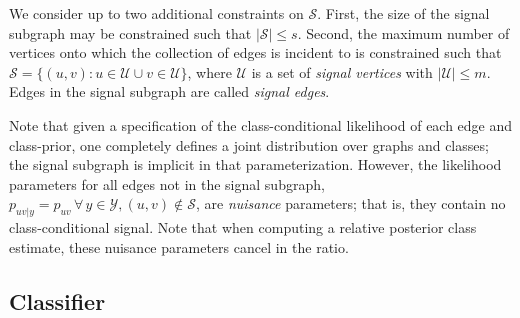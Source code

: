 \documentclass[10pt,journal,cspaper,compsoc]{IEEEtran}
\providecommand{\mc}[1]{\mathcal{#1}}
\begin{document}
We consider up to two additional constraints on $\mc{S}$.  First, the size of the signal subgraph may be constrained such that $|\mc{S}| \leq s$. Second, the maximum number of vertices onto which the collection of edges is incident to is constrained such that $\mc{S}=\{(u,v): u \in \mc{U} \cup v \in \mc{U}\}$, where $\mc{U}$ is a set of \emph{signal vertices} with $|\mc{U}|\leq m$. Edges in the signal subgraph are called \emph{signal edges}. 

Note that given a specification of the class-conditional likelihood of each edge and class-prior, one completely defines a joint distribution over graphs and classes; the signal subgraph is implicit in that parameterization. However, the likelihood parameters for all edges not in the signal subgraph, $p_{uv|y}=p_{uv} \, \forall \, y \in \mc{Y}, (u,v) \notin \mc{S}$,  are \emph{nuisance} parameters; that is, they contain no class-conditional signal.  Note that when computing a relative posterior class estimate, these nuisance parameters cancel in the ratio.




\subsection{Classifier} %
\label{sub:classifier}
\end{document}

